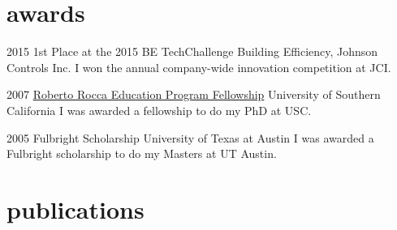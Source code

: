 \documentclass[]{../friggeri-cv} %
\begin{document}
\section{awards}

\begin{entrylist}


\entry
{2015}
{1st Place at the 2015 BE TechChallenge}
{Building Efficiency, Johnson Controls Inc.}
{I won the annual company-wide innovation competition at JCI.}

\entry
{2007}
{\href{http://www.robertorocca.org/en/fellowships/fellows07.aspx}{Roberto Rocca Education Program Fellowship}}
{University of Southern California}
{I was awarded a fellowship to do my PhD at USC.}

\entry
{2005}
{Fulbright Scholarship}
{University of Texas at Austin}
{I was awarded a Fulbright scholarship to do my Masters at UT Austin.}


\end{entrylist}





\section{publications}


\end{document}
